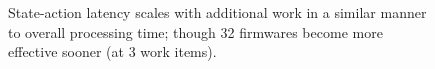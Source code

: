 \documentclass[sigconf,natbib=false]{acmart}
\begin{document}
\begin{figure}
	\caption{State-action latency scales with additional work in a similar manner to overall processing time; though \SI{32}{\bit} firmwares become more effective sooner (at \num{3} work items).\label{fig:vary-work-latency}}
\end{figure}
\end{document}
